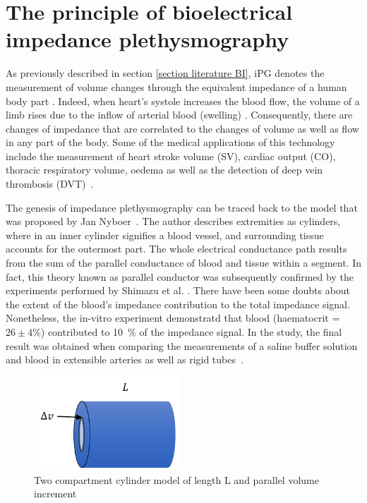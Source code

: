 \section{The principle of bioelectrical impedance plethysmography} 
\label{section iPG principle}
As previously described in section \ref{section literature BI}, iPG denotes the measurement of volume changes through the equivalent impedance of a human body part \cite{corciova2011peripheral}. Indeed, when heart's systole increases the blood flow, the volume of a limb rises due to the inflow of arterial blood (swelling) \cite{martinsen2011bioimpedance}. Consequently, there are changes of impedance that are correlated to the changes of volume as well as flow in any part of the body. Some of the medical applications of this technology include the measurement of heart stroke volume (SV), cardiac output (CO), thoracic respiratory volume, oedema as well as the detection of deep vein thrombosis (DVT)~\cite{holohan1996plethysmography}.  

The genesis of impedance plethysmography can be traced back to the model that was proposed by Jan Nyboer~\cite{nyober1950electrical}. The author describes extremities as cylinders, where in an inner cylinder signifies a blood vessel, and surrounding tissue accounts for the outermost part. The whole electrical conductance path results from the sum of the parallel conductance of blood and tissue within a segment. In fact, this theory known as parallel conductor was subsequently confirmed by the experiments performed by Shimazu et al. \cite{shimazu1982evaluation}. There have been some doubts about the extent of the blood's impedance contribution to the total impedance signal. Nonetheless, the in-vitro experiment demonstratd that blood (haematocrit = $ 26 \pm 4 \%$) contributed to \SI{10}{\percent} of the impedance signal. In the study, the final result was obtained when comparing the measurements of a saline buffer solution and blood in extensible arteries as well as rigid tubes~\cite{peura1978influence}.

\begin{figure}[!htpb]
	\centering
	\includegraphics[width=5.5cm,keepaspectratio]{figure5}    
	\caption[Two compartment cylinder model]{Two compartment cylinder model of length L and parallel volume increment}
	\label{fig:two cylinder model}
\end{figure} 

